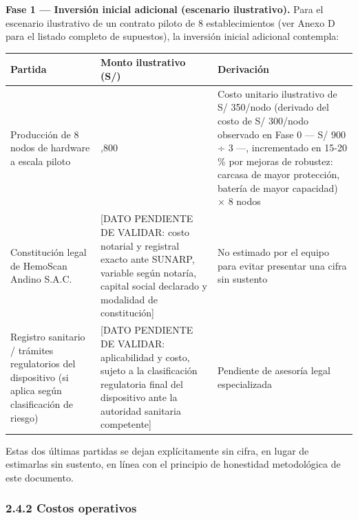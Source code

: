 \documentclass[11pt,a4paper]{article}
\begin{document}
\textbf{Fase 1 --- Inversión inicial adicional (escenario ilustrativo).} Para el escenario ilustrativo de un contrato piloto de 8 establecimientos (ver Anexo D para el listado completo de supuestos), la inversión inicial adicional contempla:

{\small
\begin{longtable}[]{@{}
  >{\raggedright\arraybackslash}p{}
  >{\raggedright\arraybackslash}p{}
  >{\raggedright\arraybackslash}p{}@{}}
\toprule\noalign{}
\begin{minipage}[b]{\linewidth}\raggedright
Partida
\end{minipage} & \begin{minipage}[b]{\linewidth}\raggedright
Monto ilustrativo (S/)
\end{minipage} & \begin{minipage}[b]{\linewidth}\raggedright
Derivación
\end{minipage} \\
\midrule\noalign{}
\endhead
\bottomrule\noalign{}
\endlastfoot
Producción de 8 nodos de hardware a escala piloto & 2,800 & Costo unitario ilustrativo de S/ 350/nodo (derivado del costo de S/ 300/nodo observado en Fase 0 --- S/ 900 ÷ 3 ---, incrementado en 15-20 \% por mejoras de robustez: carcasa de mayor protección, batería de mayor capacidad) × 8 nodos \\
Constitución legal de HemoScan Andino S.A.C. & {[}DATO PENDIENTE DE VALIDAR: costo notarial y registral exacto ante SUNARP, variable según notaría, capital social declarado y modalidad de constitución{]} & No estimado por el equipo para evitar presentar una cifra sin sustento \\
Registro sanitario / trámites regulatorios del dispositivo (si aplica según clasificación de riesgo) & {[}DATO PENDIENTE DE VALIDAR: aplicabilidad y costo, sujeto a la clasificación regulatoria final del dispositivo ante la autoridad sanitaria competente{]} & Pendiente de asesoría legal especializada \\
\end{longtable}
}

Estas dos últimas partidas se dejan explícitamente sin cifra, en lugar de estimarlas sin sustento, en línea con el principio de honestidad metodológica de este documento.

\subsubsection{2.4.2 Costos operativos}\label{costos-operativos}
\end{document}
